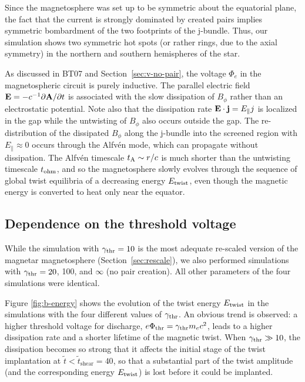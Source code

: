 Since the magnetosphere was set up to be symmetric about the equatorial plane,
the fact that the current is strongly dominated by created pairs  implies
symmetric bombardment of the two footprints of the j-bundle. Thus, our simulation
shows two symmetric hot spots (or rather rings, due to the axial symmetry) in the
northern and southern hemispheres of the star.

As discussed in BT07 and Section~\ref{sec:v-no-pair}, the voltage $\Phi_e$ in
the magnetospheric circuit is purely inductive. The parallel electric field
${\mathbf E}= -c^{-1}\partial \mathbf{A}/\partial t$ is associated with the slow
dissipation of $B_{\phi}$ rather than an electrostatic potential.
Note also that the dissipation rate ${\mathbf E}\cdot{\mathbf j}=E_\parallel j$ is localized in the
gap while the untwisting of $B_\phi$ also occurs outside the gap. The re-distribution of the
dissipated $B_\phi$ along the j-bundle into the screened region with $E_\parallel\approx 0$
occurs through the Alfv\'en mode, which can propagate without dissipation.
The Alfv\'en timescale $t_{\rm A}\sim r/c$ is much shorter than the untwisting timescale $t_{\rm ohm}$,
and so the magnetosphere slowly evolves through the sequence of global twist equilibria
of a decreasing energy
$E_{\rm twist}$,
even though the magnetic energy is converted to heat only
near the equator.


\subsection{Dependence on the threshold voltage}
\label{sec:voltage}


While the simulation with $\gamma_{\rm thr}=10$ is the most adequate re-scaled version of the
magnetar magnetosphere (Section~\ref{sec:rescale}), we also performed simulations with
$\gamma_{\rm thr}=20$, 100, and $\infty$ (no pair creation). All other parameters of the four
simulations were identical.

Figure \ref{fig:b-energy} shows the evolution of the twist energy $E_{\rm twist}$
in the simulations with the four different values of $\gamma_{\rm thr}$. An obvious trend is observed:
a higher threshold voltage for discharge, $e\Phi_{\rm thr}=\gamma_{\rm thr} m_ec^2$, leads to a higher
dissipation rate and a shorter lifetime of the magnetic twist. When $\gamma_{\rm thr}\gg 10$,
the dissipation becomes so strong that it affects the initial stage of the twist
implantation at $\tilde{t}<\tilde{t}_\mathrm{shear}=40$, so that a substantial part of the twist amplitude
(and the corresponding energy $E_{\rm twist}$) is lost before it could be implanted.


